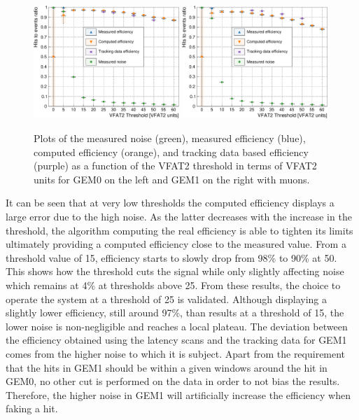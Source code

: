       \begin{figure}[h!]
        \centering
        \includegraphics[width=0.49\textwidth]{img/plots/cEfficiency_Threshold_GEM0-crop}
        \includegraphics[width=0.49\textwidth]{img/plots/cEfficiency_Threshold_GEM1-crop}
        \caption{Plots of the measured noise (green), measured efficiency (blue), computed efficiency (orange), and tracking data based efficiency (purple) as a function of the VFAT2 threshold in terms of VFAT2 units for GEM0 on the left and GEM1 on the right with muons.}
        \label{fig:II-3-data-eff-threshold}
      \end{figure}

      It can be seen that at very low thresholds the computed efficiency displays a large error due to the high noise. As the latter decreases with the increase in the threshold, the algorithm computing the real efficiency is able to tighten its limits ultimately providing a computed efficiency close to the measured value. From a threshold value of 15, efficiency starts to slowly drop from 98\% to 90\% at 50. This shows how the threshold cuts the signal while only slightly affecting noise which remains at 4\% at thresholds above 25. From these results, the choice to operate the system at a threshold of 25 is validated. Although displaying a slightly lower efficiency, still around 97\%, than results at a threshold of 15, the lower noise is non-negligible and reaches a local plateau. The deviation between the efficiency obtained using the latency scans and the tracking data for GEM1 comes from the higher noise to which it is subject. Apart from the requirement that the hits in GEM1 should be within a given windows around the hit in GEM0, no other cut is performed on the data in order to not bias the results. Therefore, the higher noise in GEM1 will artificially increase the efficiency when faking a hit.

